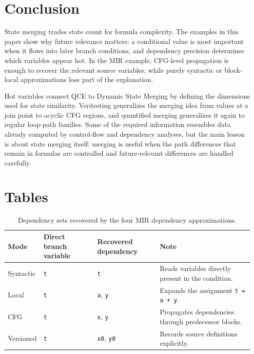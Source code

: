 \documentclass[conference]{IEEEtran}
\newcommand{\tighttable}{\scriptsize\renewcommand{\arraystretch}{1.16}}
\begin{document}
\section{Conclusion}
\label{sec:conclusion}

State merging trades state count for formula complexity. The examples in this
paper show why future relevance matters: a conditional value is most important
when it flows into later branch conditions, and dependency precision determines
which variables appear hot. In the MIR example, CFG-level propagation is
enough to recover the relevant source variables, while purely
syntactic or block-local approximations lose part of the explanation.

Hot variables connect QCE to Dynamic State Merging by defining the dimensions
used for state similarity. Veritesting generalizes the merging idea from values
at a join point to acyclic CFG regions, and quantified merging generalizes it
again to regular loop-path families. Some of the required information resembles
data already computed by control-flow and dependency analyses, but the main
lesson is about state merging itself: merging is useful when the path
differences that remain in formulas are controlled and future-relevant
differences are handled carefully.





\clearpage
\onecolumn

\appendices
\renewcommand{\theHtable}{appendix.\Alph{section}.\arabic{table}}
\section{Tables}
\label{app:tables}
\begingroup
\renewcommand{\tighttable}{\footnotesize\renewcommand{\arraystretch}{0.95}}
\setlength{\tabcolsep}{3pt}
\setlength{\floatsep}{4pt plus 1pt minus 1pt}
\setlength{\textfloatsep}{4pt plus 1pt minus 1pt}
\setlength{\intextsep}{4pt plus 1pt minus 1pt}
\setlength{\abovecaptionskip}{2pt}
\setlength{\belowcaptionskip}{2pt}

\begin{table}[H]
\caption{Dependency sets recovered by the four MIR dependency approximations.}
\label{tab:qce-dependency-modes}
\centering
\tighttable
\begin{tabularx}{\textwidth}{@{}lllY@{}}
\toprule
Mode & Direct branch variable & Recovered dependency & Note \\
\midrule
Syntactic
& \texttt{t}
& \texttt{t}
& Reads variables directly present in the condition. \\
Local
& \texttt{t}
& \texttt{a}, \texttt{y}
& Expands the assignment \texttt{t = a + y}. \\
CFG
& \texttt{t}
& \texttt{x}, \texttt{y}
& Propagates dependencies through predecessor blocks. \\
Versioned
& \texttt{t}
& \texttt{x0}, \texttt{y0}
& Records source definitions explicitly. \\
\bottomrule
\end{tabularx}
\end{table}
\end{document}
